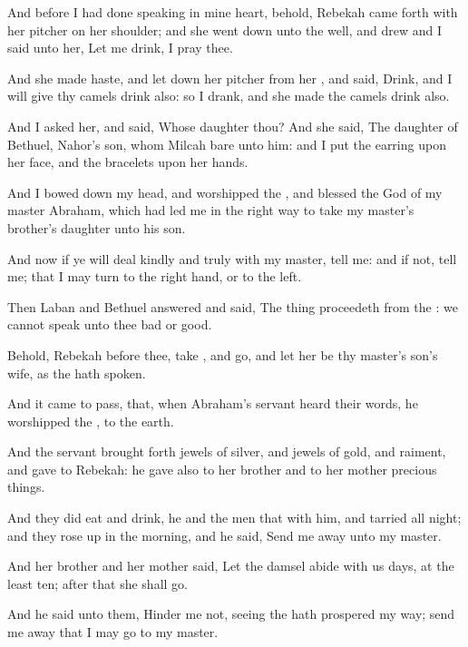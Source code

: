 {And before I had
done
speaking in mine
heart, behold,
Rebekah came
forth with her
pitcher on her
shoulder; and she went
down unto the
well, and
drew
{} and I
said unto her, Let me
drink, I pray thee.

And she made
haste, and let
down her
pitcher from her
{}, and
said,
Drink, and I will
give thy
camels
drink also: so I
drank, and she
made the
camels
drink also.

And I
asked her, and
said, Whose
daughter
{} thou? And she
said, The
daughter of
Bethuel,
Nahor’s
son, whom
Milcah
bare unto him: and I
put the
earring upon her
face, and the
bracelets upon her
hands.

And I bowed down my
head, and
worshipped the
{}, and
blessed the
{}
God of my
master
Abraham, which had led
me in the
right
way to
take my
master’s
brother’s
daughter unto his
son.

And now if ye
will
deal
kindly and
truly with my
master,
tell me: and if not,
tell me; that I may
turn to the right
hand,
or to the
left.

Then
Laban and
Bethuel
answered and
said, The
thing
proceedeth from the
{}: we
cannot
speak unto thee
bad
or
good.

Behold,
Rebekah
{} before
thee,
take
{}, and
go, and let her be thy
master’s
son’s
wife, as the
{} hath
spoken.

And it came to pass, that, when
Abraham’s
servant
heard their
words, he
worshipped the
{},
{} to the
earth.

And the
servant brought
forth
jewels of
silver, and
jewels of
gold, and
raiment, and
gave
{} to
Rebekah: he
gave also to her
brother and to her
mother precious
things.


\par }{\PP {}And they did
eat and
drink, he and the
men that
{} with him, and tarried all
night; and they rose
up in the
morning, and he
said, Send me
away unto my
master.

And her
brother and her
mother
said, Let the
damsel
abide with us
{}
days, at the
least
ten;
after that she shall
go.

And he
said unto them, Hinder
me not, seeing the
{} hath
prospered my
way; send me
away that I may
go to my
master.

}
